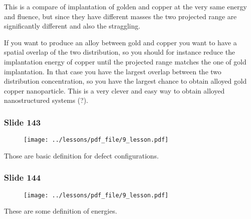 \documentclass[../main/main.tex]{subfiles}
\begin{document}
This is a compare of implantation of golden and copper at the very same energy and fluence, but since they have different masses the two projected range are significantly different and also the straggling.

If you want to produce an alloy between gold and copper you want to have a spatial overlap of the two distribution, so you should for instance reduce the implantation energy of copper until  the projected range matches the one of gold implantation.
In that case you have the largest overlap between the two distribution concentration, so you have the largest chance to obtain alloyed gold copper nanoparticle. This is a very clever and easy way to obtain alloyed nanostructured systems (?).

\newpage

\subsubsection{Slide 143}

\begin{figure}[h!]
\centering
\texttt{[image: ../lessons/pdf\_file/9\_lesson.pdf]}
\end{figure}

Those are basic definition for defect configurations.

\newpage

\subsubsection{Slide 144}

\begin{figure}[h!]
\centering
\texttt{[image: ../lessons/pdf\_file/9\_lesson.pdf]}
\end{figure}

These are some definition of energies.
\end{document}
